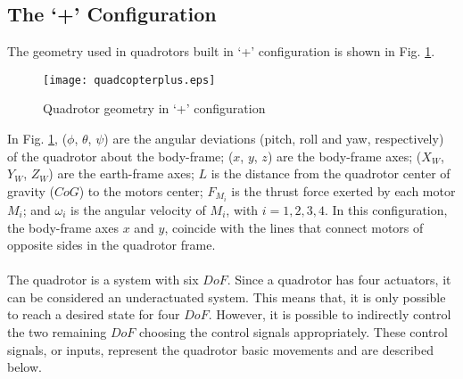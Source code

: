 \subsection{The `+' Configuration}
The geometry used in quadrotors built in `+' configuration is shown in Fig. \ref{fig:quadcopterplus}.
\\
\begin{figure}[H]
\begin{center}
  \texttt{[image: quadcopterplus.eps]}
\caption{Quadrotor geometry in `+' configuration} 
    \label{fig:quadcopterplus}
    \end{center}
\end{figure}
In Fig. \ref{fig:quadcopterplus}, ($\phi$, $\theta$, $\psi$) are the angular deviations (pitch, roll and yaw, respectively) of the quadrotor about the body-frame;
 ($x$, $y$, $z$) are the body-frame axes;  ($X_W$, $Y_W$, $Z_W$) are the earth-frame axes; $L$ is the distance from the quadrotor center of gravity ($CoG$) to the motors center; $F_{M_i}$ is the thrust force exerted by each motor $M_i$; and $\omega_i$ is the angular velocity of $M_i$, with $i = 1,2,3,4$. In this configuration, the body-frame axes $x$ and $y$, coincide with the lines that connect motors of opposite sides in the quadrotor frame.
\\\\
The quadrotor is a system with six $DoF$. Since a quadrotor has four actuators, it can be considered an underactuated system. This means that, it is only possible to reach a desired state for four $DoF$. However, it is possible to indirectly control the two remaining $DoF$ choosing the control signals appropriately. These control signals, or inputs, represent the quadrotor basic movements and are described below.


